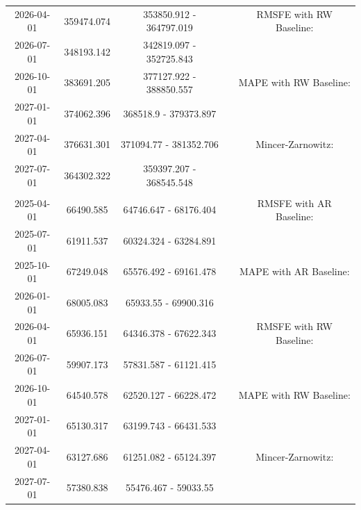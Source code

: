\begin{table}
\begin{tabular}[t]{ccccc}
\hspace{1em}2026-04-01 & 359474.074 & 353850.912 - 364797.019 &  & RMSFE with RW Baseline:\\
\hspace{1em}2026-07-01 & 348193.142 & 342819.097 - 352725.843 &  & \\
\hspace{1em}2026-10-01 & 383691.205 & 377127.922 - 388850.557 &  & MAPE with RW Baseline:\\
\hspace{1em}2027-01-01 & 374062.396 & 368518.9 - 379373.897 &  & \\
\hspace{1em}2027-04-01 & 376631.301 & 371094.77 - 381352.706 &  & Mincer-Zarnowitz:\\
\hspace{1em}2027-07-01 & 364302.322 & 359397.207 - 368545.548 &  & \\
\addlinespace[0.3em]
\multicolumn{5}{l}{\textbf{RealVAIndustry}}\\
\hspace{1em}2025-04-01 & 66490.585 & 64746.647 - 68176.404 &  & RMSFE with AR Baseline:\\
\hspace{1em}2025-07-01 & 61911.537 & 60324.324 - 63284.891 &  & \\
\hspace{1em}2025-10-01 & 67249.048 & 65576.492 - 69161.478 &  & MAPE with AR Baseline:\\
\hspace{1em}2026-01-01 & 68005.083 & 65933.55 - 69900.316 &  & \\
\hspace{1em}2026-04-01 & 65936.151 & 64346.378 - 67622.343 &  & RMSFE with RW Baseline:\\
\hspace{1em}2026-07-01 & 59907.173 & 57831.587 - 61121.415 &  & \\
\hspace{1em}2026-10-01 & 64540.578 & 62520.127 - 66228.472 &  & MAPE with RW Baseline:\\
\hspace{1em}2027-01-01 & 65130.317 & 63199.743 - 66431.533 &  & \\
\hspace{1em}2027-04-01 & 63127.686 & 61251.082 - 65124.397 &  & Mincer-Zarnowitz:\\
\hspace{1em}2027-07-01 & 57380.838 & 55476.467 - 59033.55 &  & \\
\bottomrule
\end{tabular}
\end{table}

